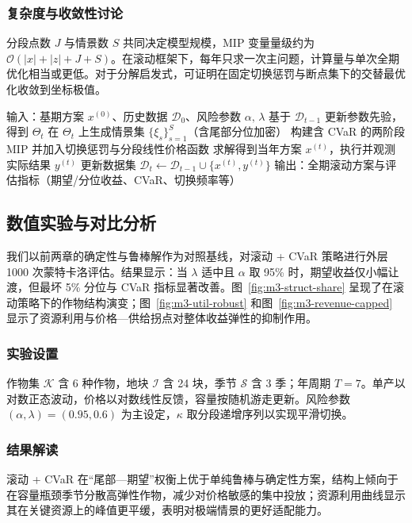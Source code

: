 \subsubsection{复杂度与收敛性讨论}
分段点数 $J$ 与情景数 $S$ 共同决定模型规模，MIP 变量量级约为 $\mathcal O(|x|+|z|+J+S)$。在滚动框架下，每年只求一次主问题，计算量与单次全期优化相当或更低。对于分解启发式，可证明在固定切换惩罚与断点集下的交替最优化收敛到坐标极值。

\begin{algorithm}[htbp]
  \caption{滚动优化 + CVaR 决策流程（以年为阶段）}
  \label{alg:rolling-cvar}
  \begin{algorithmic}[1]
    \State 输入：基期方案 $x^{(0)}$、历史数据 $\mathcal{D}_{0}$、风险参数 $\alpha,\,\lambda$
      \State 基于 $\mathcal{D}_{t-1}$ 更新参数先验，得到 $\Theta_t$
      \State 在 $\Theta_t$ 上生成情景集 $\{\xi_s\}_{s=1}^S$（含尾部分位加密）
      \State 构建含 CVaR 的两阶段 MIP 并加入切换惩罚与分段线性价格函数
      \State 求解得到当年方案 $x^{(t)}$，执行并观测实际结果 $y^{(t)}$
      \State 更新数据集 $\mathcal{D}_{t} \leftarrow \mathcal{D}_{t-1} \cup \{x^{(t)}, y^{(t)}\}$
    \EndFor
    \State 输出：全期滚动方案与评估指标（期望/分位收益、CVaR、切换频率等）
  \end{algorithmic}
\end{algorithm}

\subsection{数值实验与对比分析}
我们以前两章的确定性与鲁棒解作为对照基线，对滚动 + CVaR 策略进行外层 1000 次蒙特卡洛评估。结果显示：当 $\lambda$ 适中且 $\alpha$ 取 95\% 时，期望收益仅小幅让渡，但最坏 5\% 分位与 CVaR 指标显著改善。图~\ref{fig:m3-struct-share} 呈现了在滚动策略下的作物结构演变；图~\ref{fig:m3-util-robust} 和图~\ref{fig:m3-revenue-capped} 显示了资源利用与价格—供给拐点对整体收益弹性的抑制作用。

\subsubsection{实验设置}
作物集 $\mathcal K$ 含 6 种作物，地块 $\mathcal I$ 含 24 块，季节 $\mathcal S$ 含 3 季；年周期 $T=7$。单产以对数正态波动，价格以对数线性反馈，容量按随机游走更新。风险参数 $(\alpha,\lambda)=(0.95,0.6)$ 为主设定，$\kappa$ 取分段递增序列以实现平滑切换。

\subsubsection{结果解读}
滚动 + CVaR 在“尾部—期望”权衡上优于单纯鲁棒与确定性方案，结构上倾向于在容量瓶颈季节分散高弹性作物，减少对价格敏感的集中投放；资源利用曲线显示其在关键资源上的峰值更平缓，表明对极端情景的更好适配能力。

